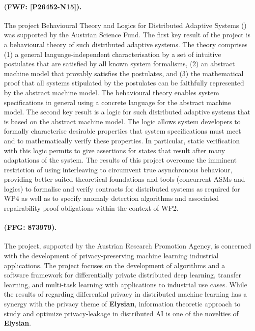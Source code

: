 \documentclass[a4paper,11pt]{article}
\newcommand{\project}[1]{\textbf{#1}\xspace}
\newcommand{\SECURITY}{\project{Elysian}}
\newcommand{\TheProject}{\SECURITY}
\begin{document}
\begin{mdframed}[backgroundcolor=blue!5]
\paragraph{\blogdas (FWF: [P26452-N15]).} 
The project Behavioural Theory and Logics for Distributed Adaptive Systems (\blogdas) was supported by the Austrian Science Fund. The first key result of the project is a behavioural theory of such distributed adaptive systems. The theory comprises (1) a general language-independent characterisation by a set of intuitive postulates that are satisfied by all known system formalisms, (2) an abstract machine model that provably satisfies the postulates, and (3) the mathematical proof that all systems stipulated by the postulates can be faithfully represented by the abstract machine model. The behavioural theory enables system specifications in general using a concrete language for the abstract machine model. The second key result is a logic for such distributed adaptive systems that is based on the abstract machine model. The logic allows system developers to formally characterise desirable properties that system specifications must meet and to mathematically verify these properties. In particular, static verification with this logic permits to give assertions for states that result after many adaptations of the system.
The results of this project overcome the imminent restriction of using interleaving to circumvent true asynchronous behaviour, providing better suited theoretical foundations and tools (concurrent ASMs and logics) to formalise and verify contracts for distributed systems as required for WP4 as well as to specify anomaly detection algorithms and associated repairability proof obligations within the context of WP2.  
\end{mdframed}

\begin{mdframed}[backgroundcolor=blue!5]
\paragraph{\primal (FFG: 873979).}
The \primal project, supported by the Austrian Research Promotion Agency, is concerned with the development of privacy-preserving machine learning industrial applications. The project focuses on the development of algorithms and a software framework for differentially private distributed deep learning, transfer learning, and multi-task learning with applications to industrial use cases. While the results of \primal regarding differential privacy in distributed machine learning has a synergy with the privacy theme of \TheProject{}, information theoretic approach to study and optimize privacy-leakage in distributed AI is one of the novelties of \TheProject{}.
\end{mdframed}
\end{document}
